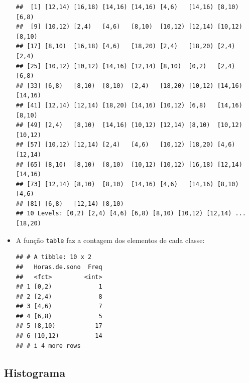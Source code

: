 \documentclass[
  11pt]{report}
\newenvironment{Shaded}{\begin{snugshade}}{\end{snugshade}}
\newcommand{\AttributeTok}[1]{\textcolor[rgb]{0.77,0.63,0.00}{#1}}
\newcommand{\ConstantTok}[1]{\textcolor[rgb]{0.00,0.00,0.00}{#1}}
\newcommand{\DecValTok}[1]{\textcolor[rgb]{0.00,0.00,0.81}{#1}}
\newcommand{\FunctionTok}[1]{\textcolor[rgb]{0.00,0.00,0.00}{#1}}
\newcommand{\NormalTok}[1]{#1}
\newcommand{\SpecialCharTok}[1]{\textcolor[rgb]{0.00,0.00,0.00}{#1}}
\newcommand{\StringTok}[1]{\textcolor[rgb]{0.31,0.60,0.02}{#1}}
\renewenvironment{Shaded}{
    \begin{mdframed}[%
      roundcorner=2pt,%
      innerleftmargin=5pt,%
      innerrightmargin=5pt,%
      topline=true,%
      leftline=true,%
      rightline=true,%
      bottomline=true,%
      linewidth=0.5pt,%
      linecolor=black!20,%
      backgroundcolor=black!2,%
      skipabove=2ex,%
      skipbelow=2.5ex%
    ]%
  }
  {
    \end{mdframed}
  }
\begin{document}
\begin{itemize}
\begin{verbatim}
##  [1] [12,14) [16,18) [14,16) [14,16) [4,6)   [14,16) [8,10)  [6,8)  
##  [9] [10,12) [2,4)   [4,6)   [8,10)  [10,12) [12,14) [10,12) [8,10) 
## [17] [8,10)  [16,18) [4,6)   [18,20) [2,4)   [18,20) [2,4)   [2,4)  
## [25] [10,12) [10,12) [14,16) [12,14) [8,10)  [0,2)   [2,4)   [6,8)  
## [33] [6,8)   [8,10)  [8,10)  [2,4)   [18,20) [10,12) [14,16) [14,16)
## [41] [12,14) [12,14) [18,20) [14,16) [10,12) [6,8)   [14,16) [8,10) 
## [49] [2,4)   [8,10)  [14,16) [10,12) [12,14) [8,10)  [10,12) [10,12)
## [57] [10,12) [12,14) [2,4)   [4,6)   [10,12) [18,20) [4,6)   [12,14)
## [65] [8,10)  [8,10)  [8,10)  [10,12) [10,12) [16,18) [12,14) [14,16)
## [73] [12,14) [8,10)  [8,10)  [14,16) [4,6)   [14,16) [8,10)  [4,6)  
## [81] [6,8)   [12,14) [8,10) 
## 10 Levels: [0,2) [2,4) [4,6) [6,8) [8,10) [10,12) [12,14) ... [18,20)
\end{verbatim}
\item
  A função \texttt{table} faz a contagem dos elementos de cada classe:

\begin{Shaded}
\end{Shaded}

\begin{verbatim}
## # A tibble: 10 x 2
##   Horas.de.sono  Freq
##   <fct>         <int>
## 1 [0,2)             1
## 2 [2,4)             8
## 3 [4,6)             7
## 4 [6,8)             5
## 5 [8,10)           17
## 6 [10,12)          14
## # i 4 more rows
\end{verbatim}
\end{itemize}

\hypertarget{histograma}{%
\subsection{Histograma}\label{histograma}}
\end{document}
